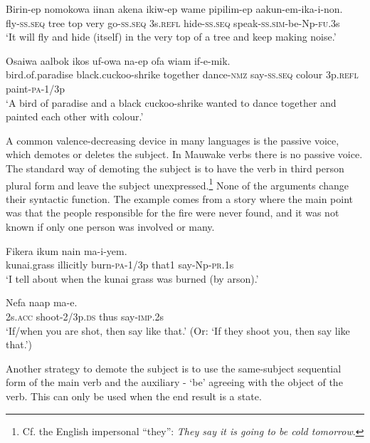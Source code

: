 \ea%
\label{ex:3:x1834}
\gll Birin-ep nomokowa iinan akena ikiw-ep wame pipilim-ep aakun-em-ika-i-non.\\
fly-\textsc{ss}.\textsc{seq} tree top very go-\textsc{ss}.\textsc{seq} 3s.\textsc{refl} hide-\textsc{ss}.\textsc{seq} speak-\textsc{ss}.\textsc{sim}-be-Np-\textsc{fu}.3s\\
\glt`It will fly and hide (itself) in the very top of a tree and keep making noise.'
\z

\ea%
\label{ex:3:x1835}
\gll Osaiwa aalbok ikos uf-owa na-ep ofa wiam if-e-mik.\\
bird.of.paradise black.cuckoo-shrike together dance-\textsc{nmz} say-\textsc{ss}.\textsc{seq} colour 3p.\textsc{refl} paint-\textsc{pa}-1/3p\\
\glt`A bird of paradise and a black cuckoo-shrike wanted to dance together and painted each other with colour.'
\z

A common valence-decreasing device in many languages is the passive voice, which demotes or deletes the subject. In Mauwake verbs there is no passive voice. The standard way of demoting the subject is to have the verb in third person plural form and leave the subject  unexpressed.\footnote{Cf. the English impersonal ``they'': \textit{They say it is going to be cold tomorrow}.} None of the arguments change their syntactic function. The example  comes from a story where the main point was that the people responsible for the fire were never found, and it was not known if only one person was involved or many. 

\ea%
\label{ex:3:x1009}
\gll Fikera ikum  nain ma-i-yem. \\
kunai.grass illicitly burn-\textsc{pa}-1/3p that1 say-Np-\textsc{pr}.1s\\
\glt`I tell about when the kunai grass was burned (by arson).'
\z

\ea%
\label{ex:3:x1010}
\gll Nefa  naap ma-e. \\
2s.\textsc{acc} shoot-2/3p.\textsc{ds} thus say-\textsc{imp}.2s\\
\glt`If/when you are shot, then say like that.' (Or: `If they shoot you, then say like that.')
\z

Another strategy to demote the subject is to use the same-subject sequential form of the main verb and the auxiliary - `be' agreeing with the object of the verb. This can only be used when the end result is a state. 

